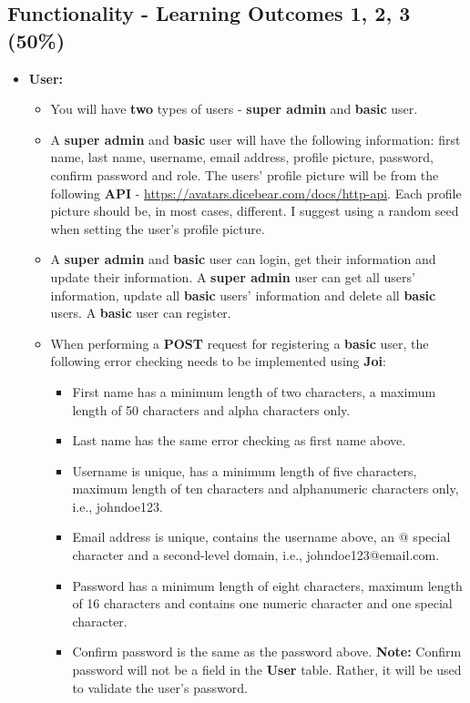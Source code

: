 \documentclass{article}
\begin{document}
\subsection*{Functionality - Learning Outcomes 1, 2, 3 (50\%)}
\begin{itemize}
	\item \textbf{User:}
	\begin{itemize}
		\item You will have \textbf{two} types of users - \textbf{super admin} and \textbf{basic} user.
		\item A \textbf{super admin} and \textbf{basic} user will have the following information: first name, last name, username, email address, profile picture, password, confirm password and role. The users' profile picture will be from the following \textbf{API} - \href{https://avatars.dicebear.com/docs/http-api}{https://avatars.dicebear.com/docs/http-api}. Each profile picture should be, in most cases, different. I suggest using a random seed when setting the user's profile picture.
		\item A \textbf{super admin} and \textbf{basic} user can login, get their information and update their information. A \textbf{super admin} user can get all users' information, update all \textbf{basic} users' information and delete all \textbf{basic} users. A \textbf{basic} user can register.
		\item When performing a \textbf{POST} request for registering a \textbf{basic} user, the following error checking needs to be implemented using \textbf{Joi}:
		\begin{itemize}
			\item First name has a minimum length of two characters, a maximum length of 50 characters and alpha characters only.
			\item Last name has the same error checking as first name above.
			\item Username is unique, has a minimum length of five characters, maximum length of ten characters and alphanumeric characters only, i.e., johndoe123.
			\item Email address is unique, contains the username above, an @ special character and a second-level domain, i.e., johndoe123@email.com.
			\item Password has a minimum length of eight characters, maximum length of 16 characters and contains one numeric character and one special character.
			\item Confirm password is the same as the password above. \textbf{Note:} Confirm password will not be a field in the \textbf{User} table. Rather, it will be used to validate the user's password.

\end{itemize}
\end{itemize}
\end{itemize}
\end{document}
